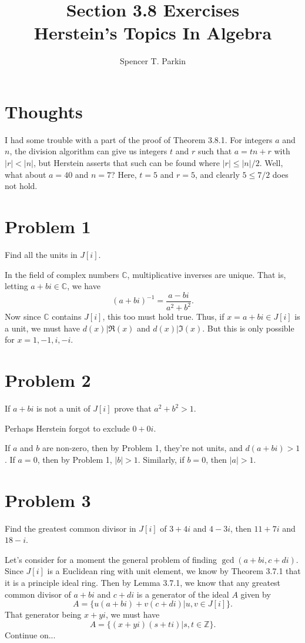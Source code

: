 \documentclass[12pt]{article}
\title{Section 3.8 Exercises\\Herstein's Topics In Algebra}
\author{Spencer T. Parkin}
\newcommand{\Z}{\mathbb{Z}}
\newcommand{\C}{\mathbb{C}}
\begin{document}
\maketitle

\section*{Thoughts}

I had some trouble with a part of the proof of Theorem 3.8.1.
For integers $a$ and $n$, the division algorithm can give us integers
$t$ and $r$ such that $a=tn+r$ with $|r|<|n|$, but Herstein asserts
that such can be found where $|r|\leq |n|/2$.  Well, what about $a=40$
and $n=7$?  Here, $t=5$ and $r=5$, and clearly $5\leq 7/2$ does not hold.

\section*{Problem 1}

Find all the units in $J[i]$.

In the field of complex numbers $\C$, multiplicative inverses are unique.
That is, letting $a+bi\in\C$, we have
\begin{equation*}
(a+bi)^{-1}=\frac{a-bi}{a^2+b^2}.
\end{equation*}
Now since $\C$ contains $J[i]$, this too must hold true.  Thus, if $x=a+bi\in J[i]$ is a unit,
we must have $d(x)|\Re(x)$ and $d(x)|\Im(x)$.  But this is only possible for $x=1,-1,i,-i$.

\section*{Problem 2}

If $a+bi$ is not a unit of $J[i]$ prove that $a^2+b^2>1$.

Perhaps Herstein forgot to exclude $0+0i$.

If $a$ and $b$ are non-zero, then by Problem 1, they're not units, and $d(a+bi)>1$.
If $a=0$, then by Problem 1, $|b|>1$.  Similarly, if $b=0$, then $|a|>1$.

\section*{Problem 3}

Find the greatest common divisor in $J[i]$ of $3+4i$ and $4-3i$, then $11+7i$ and $18-i$.

Let's consider for a moment the general problem of finding $\gcd(a+bi,c+di)$.
Since $J[i]$ is a Euclidean ring with unit element, we know by Theorem 3.7.1 that it is a principle ideal ring.
Then by Lemma 3.7.1, we know that any greatest common divisor of $a+bi$ and $c+di$ is a generator
of the ideal $A$ given by
\begin{equation*}
A=\{u(a+bi)+v(c+di)|u,v\in J[i]\}.
\end{equation*}
That generator being $x+yi$, we must have
\begin{equation*}
A=\{(x+yi)(s+ti)|s,t\in\Z\}.
\end{equation*}
Continue on...
\end{document}
